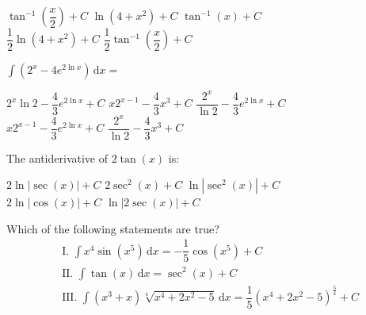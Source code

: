 \begin{questions}
    \begin{oneparchoices}
        \choice $\tan^{-1} \left(\dfrac{x}{2}\right) + C$
        \choice $\ln \left(4 + x^2\right) + C$
        \choice $\tan^{-1} (x) + C$ \\[11pt]
        \makebox[0.20\textwidth] \choice $\dfrac{1}{2}\ln \left(4 + x^2\right) + C$
        \makebox[0.22\textwidth] \choice $\dfrac{1}{2}\tan^{-1} \left(\dfrac{x}{2}\right) + C$
    \end{oneparchoices} \par \horizontalline

    \question $\int \left(2^x - 4e^{2\ln x}\right) \,\mathrm{d}x = $ \\

    \begin{oneparchoices}
        \choice $2^x\ln 2 - \dfrac{4}{3}e^{2\ln x} + C$
        \choice $x2^{x - 1} - \dfrac{4}{3}x^3 + C$
        \choice $\dfrac{2^x}{\ln 2} - \dfrac{4}{3}e^{2\ln x} + C$ \\[11pt]
        \makebox[0.19\textwidth] \choice $x2^{x - 1} - \dfrac{4}{3}e^{2\ln x} + C$
        \makebox[0.19\textwidth] \choice $\dfrac{2^x}{\ln 2} - \dfrac{4}{3}x^3 + C$
    \end{oneparchoices} \par \horizontalline

    \question The antiderivative of $2\tan (x)$ is: \\

    \begin{oneparchoices}
        \choice $2\ln |\sec (x)| + C$ 
        \choice $2\sec^2 (x) + C$
        \choice $\ln |\sec^2 (x)| + C$ \\[11pt]
        \makebox[0.21\textwidth] \choice $2\ln |\cos (x)| + C$
        \makebox[0.22\textwidth] \choice $\ln |2\sec (x)| + C$
    \end{oneparchoices} \par \horizontalline

    \question Which of the following statements are true? \begin{align*}
        & \text{I. } \int x^4\sin \left(x^5\right) \,\mathrm{d}x = -\dfrac{1}{5}\cos \left(x^5\right) + C \\[11pt]
        & \text{II. } \int \tan (x) \,\mathrm{d}x = \sec^2 (x) + C \\[11pt]
        & \text{III. } \int \left(x^3 + x\right)\sqrt[4]{x^4 + 2x^2 - 5} \,\mathrm{d}x = \dfrac{1}{5}\left(x^4 + 2x^2 - 5\right)^{\frac{5}{4}} + C
    \end{align*}


\end{questions}
